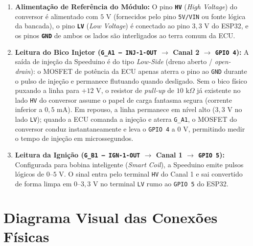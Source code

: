 \documentclass[12pt,a4paper]{article}
\begin{document}
\begin{enumerate}[itemsep=4pt]
    \item \textbf{Alimentação de Referência do Módulo:} O pino \textbf{\texttt{HV}} (\textit{High Voltage}) do conversor é alimentado com \textbf{$5\text{ V}$} (fornecidos pelo pino \texttt{5V/VIN} ou fonte lógica da bancada), o pino \textbf{\texttt{LV}} (\textit{Low Voltage}) é conectado ao pino \textbf{$3{,}3\text{ V}$} do ESP32, e os pinos \textbf{\texttt{GND}} de ambos os lados são interligados ao terra comum da ECU.
    \item \textbf{Leitura do Bico Injetor (\texttt{G\_A1 -- INJ-1-OUT} $\rightarrow$ Canal 2 $\rightarrow$ \texttt{GPIO 4}):} A saída de injeção da Speeduino é do tipo \textit{Low-Side} (dreno aberto / \textit{open-drain}): o MOSFET de potência da ECU apenas aterra o pino ao \texttt{GND} durante o pulso de injeção e permanece flutuando quando desligado. Sem o bico físico puxando a linha para $+12\text{ V}$, o resistor de \textit{pull-up} de $10\text{ k}\Omega$ já existente no lado \texttt{HV} do conversor assume o papel de carga fantasma segura (corrente inferior a $0{,}5\text{ mA}$). Em repouso, a linha permanece em nível alto ($3{,}3\text{ V}$ no lado \texttt{LV}); quando a ECU comanda a injeção e aterra \texttt{G\_A1}, o MOSFET do conversor conduz instantaneamente e leva o \texttt{GPIO 4} a $0\text{ V}$, permitindo medir o tempo de injeção em microssegundos.
    \item \textbf{Leitura da Ignição (\texttt{G\_B1 -- IGN-1-OUT} $\rightarrow$ Canal 1 $\rightarrow$ \texttt{GPIO 5}):} Configurada para bobina inteligente (\textit{Smart Coil}), a Speeduino emite pulsos lógicos de $0\text{--}5\text{ V}$. O sinal entra pelo terminal \texttt{HV} do Canal 1 e sai convertido de forma limpa em $0\text{--}3{,}3\text{ V}$ no terminal \texttt{LV} rumo ao \texttt{GPIO 5} do ESP32.
\end{enumerate}

\newpage
\section{Diagrama Visual das Conexões Físicas}
\end{document}
